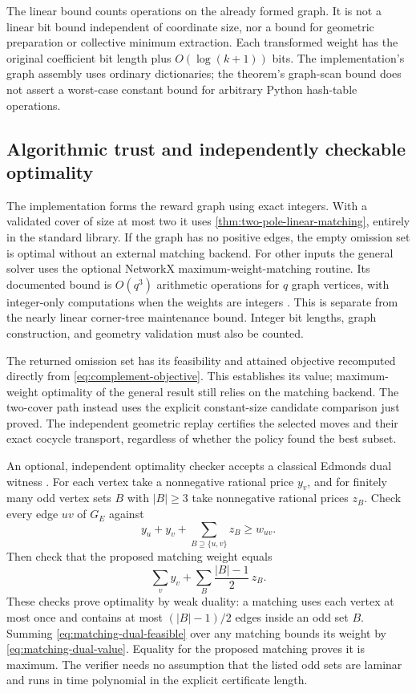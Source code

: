 The linear bound counts operations on the already formed graph.
It is not a linear bit bound independent of coordinate size,
nor a bound for geometric preparation or collective minimum
extraction. Each transformed weight has the original coefficient
bit length plus $O(\log(k+1))$ bits. The implementation's graph
assembly uses ordinary dictionaries; the theorem's graph-scan
bound does not assert a worst-case constant bound for arbitrary
Python hash-table operations.

\subsection{Algorithmic trust and independently checkable optimality}
\label{sec:matching-certificates}

The implementation forms the reward graph using exact integers.
With a validated cover of size at most two it uses
\cref{thm:two-pole-linear-matching}, entirely in the standard
library. If the graph has no positive edges, the empty omission
set is optimal without an external matching backend. For other
inputs the general solver uses the optional NetworkX
maximum-weight-matching routine.
Its documented bound is $O(q^3)$ arithmetic operations for $q$
graph vertices, with integer-only computations when the weights
are integers \cite{NetworkX}. This is separate from the nearly
linear corner-tree maintenance bound. Integer bit lengths, graph
construction, and geometry validation must also be counted.

The returned omission set has its feasibility and attained
objective recomputed directly from
\eqref{eq:complement-objective}. This establishes its value;
maximum-weight optimality of the general result still relies
on the matching backend. The two-cover path instead uses the
explicit constant-size candidate comparison just proved. The
independent geometric replay
certifies the selected moves and their exact cocycle transport,
regardless of whether the policy found the best subset.

An optional, independent optimality checker accepts a classical
Edmonds dual witness \cite{Edmonds1965}. For each vertex take a
nonnegative rational price $y_v$, and for finitely many odd
vertex sets $B$ with $|B|\ge3$ take nonnegative rational prices
$z_B$. Check every edge $uv$ of $G_E$ against
\begin{equation}\label{eq:matching-dual-feasible}
 y_u+y_v+\sum_{B\supseteq\{u,v\}}z_B\ge w_{uv}.
\end{equation}
Then check that the proposed matching weight equals
\begin{equation}\label{eq:matching-dual-value}
 \sum_v y_v+\sum_B\frac{|B|-1}{2}\,z_B.
\end{equation}
These checks prove optimality by weak duality: a matching uses
each vertex at most once and contains at most $(|B|-1)/2$ edges
inside an odd set $B$. Summing
\eqref{eq:matching-dual-feasible} over any matching bounds its
weight by \eqref{eq:matching-dual-value}. Equality for the
proposed matching proves it is maximum. The verifier needs no
assumption that the listed odd sets are laminar and runs in
time polynomial in the explicit certificate length.

